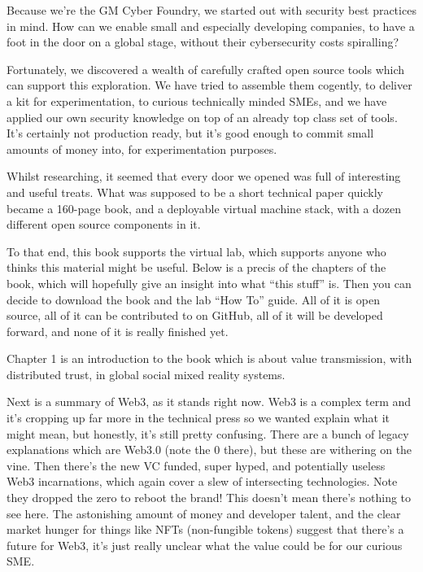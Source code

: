 Because we’re the GM Cyber Foundry, we started out with security best practices in mind. How can we enable small and especially developing companies, to have a foot in the door on a global stage, without their cybersecurity costs spiralling? \par
Fortunately, we discovered a wealth of carefully crafted open source tools which can support this exploration. We have tried to assemble them cogently, to deliver a kit for experimentation, to curious technically minded SMEs, and we have applied our own security knowledge on top of an already top class set of tools. It’s certainly not production ready, but it's good enough to commit small amounts of money into, for experimentation purposes.\par
Whilst researching, it seemed that every door we opened was full of interesting and useful treats. What was supposed to be a short technical paper quickly became a 160-page book, and a deployable virtual machine stack, with a dozen different open source components in it. \par
To that end, this book supports the virtual lab, which supports anyone who thinks this material might be useful. Below is a precis of the chapters of the book, which will hopefully give an insight into what ``this stuff'' is. Then you can decide to download the book and the lab ``How To'' guide. All of it is open source, all of it can be contributed to on GitHub, all of it will be developed forward, and none of it is really finished yet.\par
Chapter 1  is an introduction to the book which is about value transmission, with distributed trust, in global social mixed reality systems. \par
Next is a summary of Web3, as it stands right now. Web3 is a complex term and it’s cropping up far more in the technical press so we wanted explain what it might mean, but honestly, it’s still pretty confusing. There are a bunch of legacy explanations which are Web3.0 (note the 0 there), but these are withering on the vine. Then there’s the new VC funded, super hyped, and potentially useless Web3 incarnations, which again cover a slew of intersecting technologies. Note they dropped the zero to reboot the brand! This doesn’t mean there’s nothing to see here. The astonishing amount of money and developer talent, and the clear market hunger for things like NFTs (non-fungible tokens) suggest that there’s a future for Web3, it’s just really unclear what the value could be for our curious SME.\par
